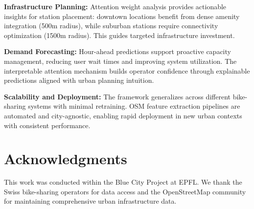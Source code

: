\documentclass[10pt,twocolumn]{article}
\begin{document}
\textbf{Infrastructure Planning:} Attention weight analysis provides actionable insights for station placement: downtown locations benefit from dense amenity integration (500m radius), while suburban stations require connectivity optimization (1500m radius). This guides targeted infrastructure investment.

\textbf{Demand Forecasting:} Hour-ahead predictions support proactive capacity management, reducing user wait times and improving system utilization. The interpretable attention mechanism builds operator confidence through explainable predictions aligned with urban planning intuition.

\textbf{Scalability and Deployment:} The framework generalizes across different bike-sharing systems with minimal retraining. OSM feature extraction pipelines are automated and city-agnostic, enabling rapid deployment in new urban contexts with consistent performance.

\section*{Acknowledgments}

This work was conducted within the Blue City Project at EPFL\@. We thank the Swiss bike-sharing operators for data access and the OpenStreetMap community for maintaining comprehensive urban infrastructure data.



\end{document}
